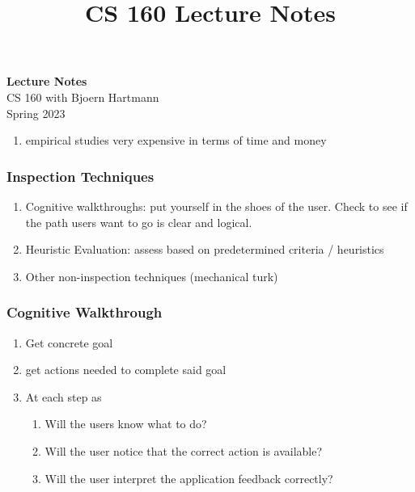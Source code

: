 \documentclass[11pt]{article}
\begin{document}
    \title{CS 160 Lecture Notes}
    
    \thispagestyle{empty}

    \begin{center}
    {\LARGE \bf Lecture Notes}\\
    {\large CS 160 with Bjoern Hartmann}\\
    Spring 2023
    \end{center}



    \begin{enumerate}
        \item empirical studies very expensive in terms of time and money
 
    \end{enumerate}

    \subsubsection{Inspection Techniques}
    \begin{enumerate}
        \item Cognitive walkthroughs: put yourself in the shoes of the user. Check to see if the path users want to go is clear and logical. 

        
        
        \item Heuristic Evaluation: assess based on predetermined criteria / heuristics

        \item Other non-inspection techniques (mechanical turk)
    \end{enumerate}

    \subsubsection{Cognitive Walkthrough}
    \begin{enumerate}
        \item Get concrete goal
        \item get actions needed to complete said goal
        \item At each step as
        \begin{enumerate}
            \item Will the users know what to do?
            \item Will the user notice that the correct action is available?
            \item Will the user interpret the application feedback correctly?
        \end{enumerate}
    \end{enumerate}
\end{document}
